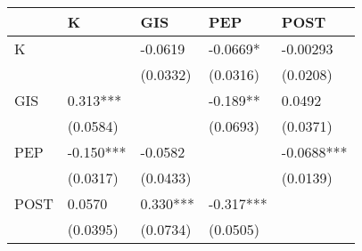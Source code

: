 \begin{tabular}{lllll}
\toprule
{} &          K &       GIS &        PEP &        POST \\
\midrule
K    &            &   -0.0619 &   -0.0669* &    -0.00293 \\
     &            &  (0.0332) &   (0.0316) &    (0.0208) \\
GIS  &   0.313*** &           &   -0.189** &      0.0492 \\
     &   (0.0584) &           &   (0.0693) &    (0.0371) \\
PEP  &  -0.150*** &   -0.0582 &            &  -0.0688*** \\
     &   (0.0317) &  (0.0433) &            &    (0.0139) \\
POST &     0.0570 &  0.330*** &  -0.317*** &             \\
     &   (0.0395) &  (0.0734) &   (0.0505) &             \\
\bottomrule
\end{tabular}
